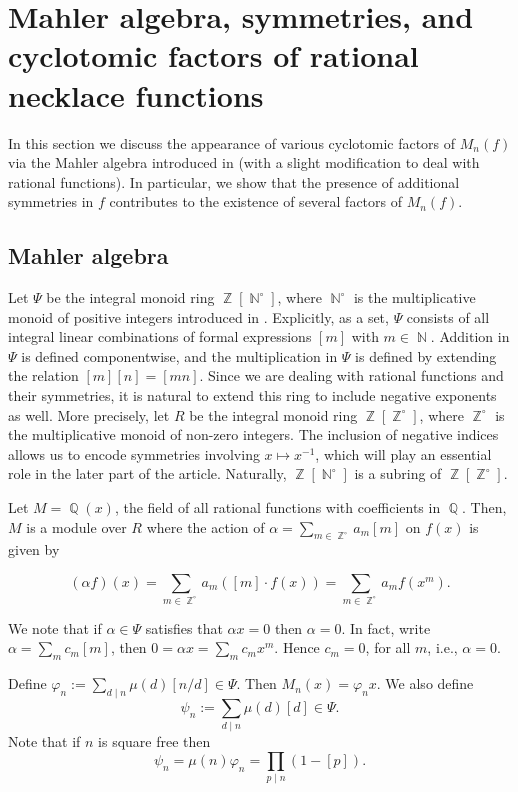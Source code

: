 \documentclass[12t,a4paper]{amsart}
\theoremstyle{definition}
\DeclareMathOperator{\Z}{\mathbb{Z}}
\DeclareMathOperator{\N}{\mathbb{N}}
\DeclareMathOperator{\Q}{\mathbb{Q}}
\numberwithin{equation}{section}
\begin{document}
{\section{Mahler algebra, symmetries, and cyclotomic factors of rational necklace functions} \label{sec:mahler}
In this section we discuss the appearance of various cyclotomic factors of $M_n(f)$ via the Mahler algebra introduced in \cite{hyde2019polynomial} (with a slight modification to deal with rational functions). In particular, we show that the presence of additional symmetries in $f$ contributes to the existence of several factors of $M_n(f)$.




\subsection{Mahler algebra}
Let $\Psi$ be the integral monoid ring $\Z[\N^\circ]$, where $\N^\circ$ is the multiplicative monoid of positive integers introduced in \cite{ hyde2019polynomial}. Explicitly, as a set, $\Psi$ consists of all integral linear combinations of formal expressions $[m]$ with $m\in \N$. Addition in $\Psi$ is defined  componentwise, and the multiplication in $\Psi$ is defined by extending the relation $[m][n]=[mn]$. Since we are dealing with rational functions and their symmetries, it is natural to extend this ring to include negative exponents as well. More precisely, let $R$ be the integral monoid ring $\Z[\Z^{\circ}]$, where $\Z^{\circ}$ is the multiplicative monoid of non-zero integers. The inclusion of negative indices allows us to encode symmetries involving $x \mapsto x^{-1}$, which will play an essential role in the later part of the article. Naturally, $\Z[\N^{\circ}]$ is a subring of $\Z[\Z^{\circ}]$. 


Let $M= \Q(x)$, the field of all rational functions with coefficients in $\Q.$ Then, $M$ is a module over $R$ where the action of  $\alpha = \sum_{m \in \Z^{\circ}} a_m[m]$ on $f(x)$ is given by 

\[ (\alpha f)(x) = \sum_{m \in \Z^{\circ}} a_m ([m] \cdot f(x))= \sum_{m \in \Z^{\circ}} a_m f(x^m). \]



We note that if $\alpha\in \Psi$ satisfies that $\alpha x=0$ then $\alpha=0$. In fact, write $\alpha =\sum_m c_m[m]$, then $0=\alpha x=\sum_m c_m x^m$. Hence $c_m=0$, for all $m$, i.e., $\alpha=0$.

Define $\varphi_n:=\sum_{d\mid n}\mu(d) [n/d] \in \Psi$. Then $M_n(x)= \varphi_n x$. We also define $$\psi_n:=\sum_{d\mid n}\mu(d) [d] \in \Psi.$$
Note that if $n$ is square free then 
\[
\psi_n=\mu(n) \varphi_n = {\prod_{p \mid n} (1-[p]).}
\]

}
\end{document}
